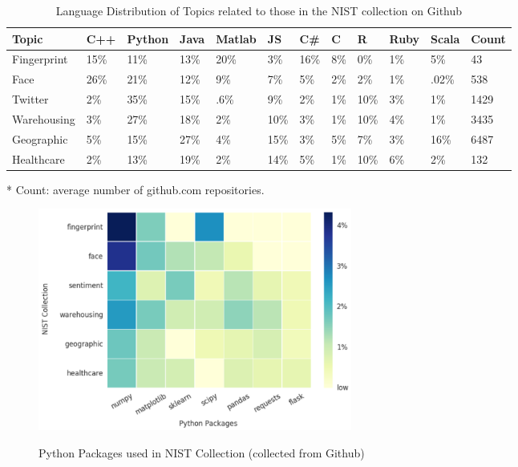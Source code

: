 \documentclass[9pt,twocolumn,twoside]{styles/osajnl}
\begin{document}
\begin{table}[htb]
  \begin{center}
    \begin{small}
      \caption{Language Distribution of Topics related to those in the NIST collection on Github}
      \label{tab:language-distribution}
      \begin{threeparttable}
	\begin{tabular}{l|l|l|l|l|l|l|l|l|l|l|l}

	  Topic & C++ &  Python &  Java &  Matlab &  JS &  C\# &  C &  R &  Ruby &  Scala &  Count\tnote{*} \tabularnewline \hline \hline
	  Fingerprint& 15\% & 11\% & 13\% & 20\% & 3\% & 16\% & 8\% & 0\% & 1\% & 5\% & 43 \tabularnewline \hline
	  Face & 26\% & 21\% & 12\% & 9\% & 7\% & 5\% & 2\% & 2\% & 1\% & .02\% & 538 \tabularnewline \hline
	  Twitter & 2\% & 35\% & 15\% & .6\% & 9\% & 2\% & 1\% & 10\% & 3\% & 1\% & 1429 \tabularnewline \hline
	  Warehousing & 3\% & 27\% & 18\% & 2\% & 10\% & 3\% & 1\% & 10\% & 4\% & 1\% & 3435  \tabularnewline \hline
	  Geographic & 5\% & 15\% & 27\% & 4\% & 15\% & 3\% & 5\% & 7\% & 3\% & 16\% & 6487 \tabularnewline \hline
	  Healthcare & 2\% & 13\% & 19\% & 2\% & 14\% & 5\% & 1\% & 10\% & 6\% & 2\% & 132 \tabularnewline

	\end{tabular}
	\begin{tablenotes}
	\item[*] Count: average number of github.com repositories.
	\end{tablenotes}
      \end{threeparttable}
    \end{small}
  \end{center}
\end{table}

\begin{figure}[htb]
  \begin{center}
    \begin{small}
  \caption{Python Packages used in NIST Collection (collected from Github)}
  \centering
  \includegraphics[width=0.5\textwidth]{images/packages-heatmap}
  \label{fig:packages-heatmap}
\end{small}
\end{center}
\end{figure}
\end{document}
